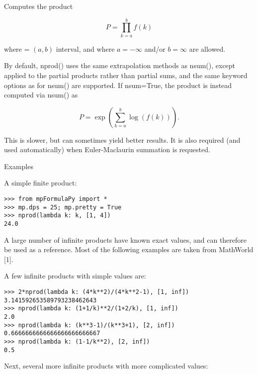 \vpara
Computes the product

\begin{equation}
P=\prod_{k=a}^b f(k)
\end{equation}

where = $(a,b)$ interval, and where $a=-\infty$ and/or $b=\infty$ are allowed.

By default, nprod() uses the same extrapolation methods as nsum(), except applied to the partial products rather than partial sums, and the same keyword options as for nsum() are supported. If nsum=True, the product is instead computed via nsum() as

\begin{equation}
P=\exp\left(\sum_{k=a}^b \log\left(f(k) \right) \right).
\end{equation}

This is slower, but can sometimes yield better results. It is also required (and used automatically) when Euler-Maclaurin summation is requested.

Examples

A simple finite product:

\begin{lstlisting}
>>> from mpFormulaPy import *
>>> mp.dps = 25; mp.pretty = True
>>> nprod(lambda k: k, [1, 4])
24.0
\end{lstlisting}

A large number of infinite products have known exact values, and can therefore be used as a reference. Most of the following examples are taken from MathWorld [1].

A few infinite products with simple values are:

\begin{lstlisting}
>>> 2*nprod(lambda k: (4*k**2)/(4*k**2-1), [1, inf])
3.141592653589793238462643
>>> nprod(lambda k: (1+1/k)**2/(1+2/k), [1, inf])
2.0
>>> nprod(lambda k: (k**3-1)/(k**3+1), [2, inf])
0.6666666666666666666666667
>>> nprod(lambda k: (1-1/k**2), [2, inf])
0.5
\end{lstlisting}

Next, several more infinite products with more complicated values:

